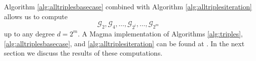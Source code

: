 \documentclass{dcthesis}
\newcommand{\mm}[1]{{\color{blue} \sf MM: [#1]}}
\numberwithin{equation}{section}
\theoremstyle{definition}
\theoremstyle{remark}
\begin{document}
{{{      %
    Algorithm
    \ref{alg:alltriplesbasecase}
    combined with
    Algorithm
    \ref{alg:alltriplesiteration}
    allows us to compute
    \begin{equation}
      \label{eqn:sequenceofgraphs}
      \mathscr{G}_2,
      \mathscr{G}_4,
      \dots,
      \mathscr{G}_{2^i},
      \dots,
      \mathscr{G}_{2^m}
    \end{equation}
    up to any degree $d=2^m$.
    A \textsf{Magma} implementation of
    Algorithms
    \ref{alg:triples},
    \ref{alg:alltriplesbasecase},
    and
    \ref{alg:alltriplesiteration}
    can be found at
    \cite{twogroupdessins}.
    In the next section we discuss
    the results of these computations.
  }
}}
\end{document}
